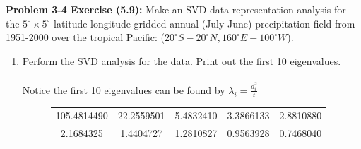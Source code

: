 \documentclass[11pt]{article}
\newenvironment{problem}[1]{\textbf{Problem #1:}}{\newpage}
\newenvironment{Shaded}{\begin{snugshade}}{\end{snugshade}}
\newcommand{\CommentTok}[1]{\textcolor[rgb]{0.56,0.35,0.01}{\textit{#1}}}
\newcommand{\DecValTok}[1]{\textcolor[rgb]{0.00,0.00,0.81}{#1}}
\newcommand{\KeywordTok}[1]{\textcolor[rgb]{0.13,0.29,0.53}{\textbf{#1}}}
\newcommand{\NormalTok}[1]{#1}
\newcommand{\OperatorTok}[1]{\textcolor[rgb]{0.81,0.36,0.00}{\textbf{#1}}}
\newcommand{\StringTok}[1]{\textcolor[rgb]{0.31,0.60,0.02}{#1}}
\begin{document}
	\begin{problem}{3-4 Exercise (5.9)}
		Make an SVD data representation analysis for the $5^\circ \times 5^\circ$ latitude-longitude gridded
		annual (July-June) precipitation field from 1951-2000 over the tropical Pacific: ($20^\circ S -20^\circ N, 160^\circ E -100^\circ W$). 
		\begin{enumerate}[label = (\alph*)]
			\item Perform the SVD analysis for the data. Print out the first 10 eigenvalues.
			\\ \\
			Notice the first 10 eigenvalues can be found by $\lambda_i = \frac{d_i^2}{t}$
			\begin{figure}[h!]
				\centering
				\begin{tabular}{|c|c|c|c|c|}
					\hline
					105.4814490 & 22.2559501 &  5.4832410 &  3.3866133 &  2.8810880 \\
					2.1684325 &  1.4404727 &  1.2810827 &  0.9563928 &  0.7468040 \\
					\hline
				\end{tabular}
			\end{figure} 
\begin{Shaded}
\end{Shaded}
\end{enumerate}
\end{problem}
\end{document}
